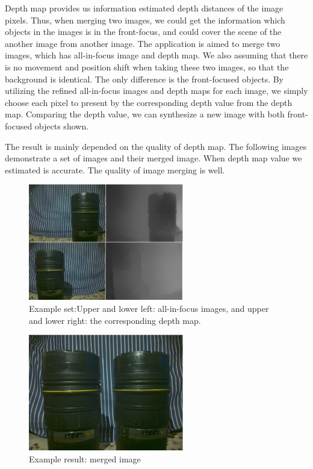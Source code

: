 \documentclass[annual]{acmsiggraph}
\begin{document}
Depth map provides us information estimated depth distances of the image pixels. Thus, when merging two images, we could get the information which objects in the images is in the front-focus, and could cover the scene of the another image from another image. The application is aimed to merge two images, which has all-in-focus image and depth map. We also assuming that there is no movement and position shift when taking these two images, so that the background is identical. The only difference is the front-focused objects. By utilizing the refined all-in-focus images and depth maps for each image, we simply choose each pixel to present by the corresponding depth value from the depth map. Comparing the depth value, we can synthesize a new image with both front-focused objects shown. 

The result is mainly depended on the quality of depth map.  The following images demonstrate a set of images and their merged image. When depth map value we estimated is accurate. The quality of image merging is well. 
\begin{figure}[h!]
   \centering
   \includegraphics[height=2.0in]{images/merged1}
   \caption{Example set:Upper and lower left: all-in-focus images, and upper and lower right: the corresponding depth map. }
\end{figure}

\begin{figure}[h!]
   \centering
   \includegraphics[height=2.0in]{images/merged}
   \caption{Example result: merged image}
\end{figure}
\end{document}
